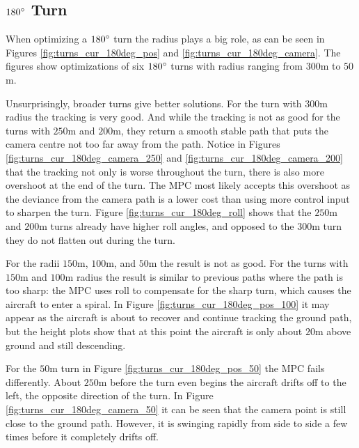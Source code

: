 \subsection{$180\degree$ Turn}
\label{subsec:180}

When optimizing a $180\degree$ turn the radius plays a big role, as can be seen in Figures \ref{fig:turns_cur_180deg_pos} and \ref{fig:turns_cur_180deg_camera}. The figures show optimizations of six $180\degree$ turns with radius ranging from $300$m to $50$m.

Unsurprisingly, broader turns give better solutions. For the turn with $300$m radius the tracking is very good. And while the tracking is not as good for the turns with $250$m and $200$m, they return a smooth stable path that puts the camera centre not too far away from the path. Notice in Figures \ref{fig:turns_cur_180deg_camera_250} and \ref{fig:turns_cur_180deg_camera_200} that the tracking not only is worse throughout the turn, there is also more overshoot at the end of the turn. The MPC most likely accepts this overshoot as the deviance from the camera path is a lower cost than using more control input to sharpen the turn. Figure \ref{fig:turns_cur_180deg_roll} shows that the $250$m and $200$m turns already have higher roll angles, and opposed to the $300$m turn they do not flatten out during the turn.

For the radii $150$m, $100$m, and $50$m the result is not as good. For the turns with $150$m and $100$m radius the result is similar to previous paths where the path is too sharp: the MPC uses roll to compensate for the sharp turn, which causes the aircraft to enter a spiral. In Figure \ref{fig:turns_cur_180deg_pos_100} it may appear as the aircraft is about to recover and continue tracking the ground path, but the height plots show that at this point the aircraft is only about $20$m above ground and still descending.

For the $50$m turn in Figure \ref{fig:turns_cur_180deg_pos_50} the MPC fails differently. About $250$m before the turn even begins the aircraft drifts off to the left, the opposite direction of the turn. In Figure \ref{fig:turns_cur_180deg_camera_50} it can be seen that the camera point is still close to the ground path. However, it is swinging rapidly from side to side a few times before it completely drifts off.

